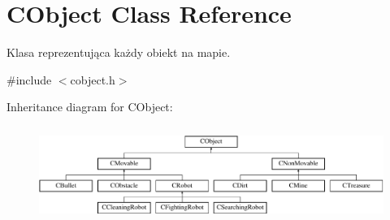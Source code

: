 \hypertarget{class_c_object}{}\section{C\+Object Class Reference}
\label{class_c_object}


Klasa reprezentująca każdy obiekt na mapie.  




{\ttfamily \#include $<$cobject.\+h$>$}

Inheritance diagram for C\+Object\+:\begin{figure}[H]
\begin{center}
\leavevmode
\includegraphics[height=3.137255cm]{class_c_object}
\end{center}
\end{figure}
